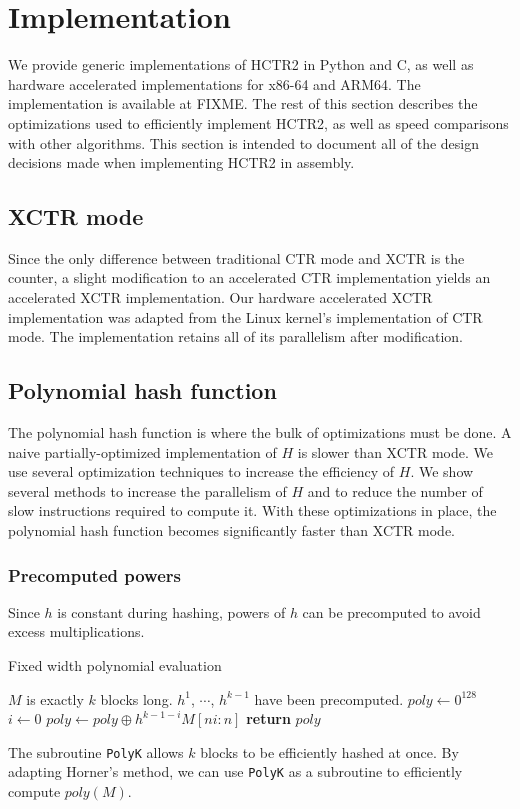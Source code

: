 \documentclass[hctr.tex]{subfiles}
\begin{document}
\section{Implementation}\label{implementation}
We provide generic implementations of HCTR2 in Python and C, as well as hardware accelerated implementations for x86-64 and ARM64. The implementation is available at {\color{red} FIXME}. The rest of this section describes the optimizations used to efficiently implement HCTR2, as well as speed comparisons with other algorithms. This section is intended to document all of the design decisions made when implementing HCTR2 in assembly.

\subsection{XCTR mode}
Since the only difference between traditional CTR mode and XCTR is the counter, a slight modification to an accelerated CTR implementation yields an accelerated XCTR implementation. Our hardware accelerated XCTR implementation was adapted from the Linux kernel's implementation of CTR mode. The implementation retains all of its parallelism after modification. 

\subsection{Polynomial hash function}
The polynomial hash function is where the bulk of optimizations must be done. A naive partially-optimized implementation of $H$ is slower than XCTR mode. We use several optimization techniques to increase the efficiency of $H$. We show several methods to increase the parallelism of $H$ and to reduce the number of slow instructions required to compute it. With these optimizations in place, the polynomial hash function becomes significantly faster than XCTR mode.

\subsubsection{Precomputed powers}
Since $h$ is constant during hashing, powers of $h$ can be precomputed to avoid excess multiplications. 
\begin{algorithm}[H]
\caption{Fixed width polynomial evaluation}\label{polykalg}
\begin{algorithmic}[1]
	\Require $M$ is exactly $k$ blocks long.
	\Require $h^1$, $\cdots$, $h^{k-1}$ have been precomputed.
		\State $poly \gets 0^{128}$
		\State $i \gets 0$
		\State $poly \gets poly \oplus h^{k-1-i}M[ni:n]$
		\EndFor
		\State \textbf{return} $poly$
	\EndProcedure
\end{algorithmic}
\end{algorithm}
The subroutine \texttt{PolyK} allows $k$ blocks to be efficiently hashed at once. By adapting Horner's method, we can use \texttt{PolyK} as a subroutine to efficiently compute $poly(M)$.
\end{document}
